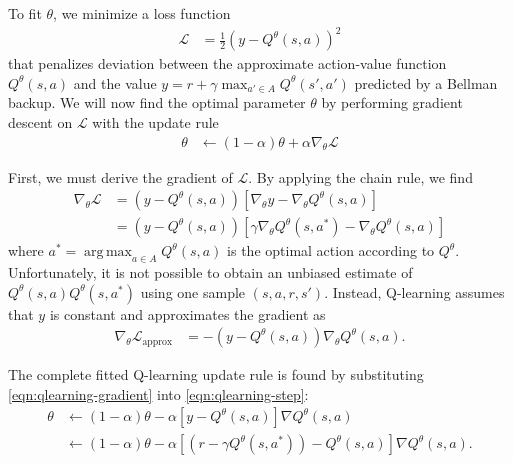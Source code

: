 \documentclass[11pt]{article}
\numberwithin{equation}{section}
\numberwithin{figure}{section}
\DeclareMathOperator*{\argmax}{arg\,max}
\begin{document}
To fit $\theta$, we minimize a loss function
\begin{align*}
    \mathcal{L} &= \frac{1}{2} \left( y - Q^\theta(s, a) \right)^2
\end{align*}
that penalizes deviation between the approximate action-value function
$Q^\theta(s, a)$ and the value $y = r + \gamma \max_{a' \in A} Q^\theta(s',
a')$ predicted by a Bellman backup. We will now find the optimal parameter
$\theta$ by performing gradient descent on $\mathcal{L}$ with the update rule
\begin{align}
    \theta &\gets (1 - \alpha) \theta + \alpha \nabla_\theta \mathcal{L}
    \label{eqn:qlearning-step}
\end{align}

First, we must derive the gradient of $\mathcal{L}$. By applying the chain
rule, we find
\begin{align*}
    \nabla_\theta \mathcal{L} &= \left(y - Q^\theta(s, a)\right) \left[
                                      \nabla_\theta y
                                    - \nabla_\theta Q^\theta(s, a) \right] \\
                              &= \left(y - Q^\theta(s, a)\right) \left[
                                      \gamma \nabla_\theta Q^\theta(s, a^*)
                                    - \nabla_\theta Q^\theta(s, a) \right]
\end{align*}
where $a^* = \argmax_{a \in A} Q^\theta(s, a)$ is the optimal action according
to $Q^\theta$. Unfortunately, it is not possible to obtain an unbiased estimate
of $Q^\theta(s, a) Q^\theta(s, a^*)$ using one sample $(s, a, r, s')$. Instead,
Q-learning assumes that $y$ is constant and approximates the gradient as
\begin{align}
    \nabla_\theta \mathcal{L}_\text{approx} &= -\left(y - Q^\theta(s, a)\right)
                                       \nabla_\theta Q^\theta(s, a).
    \label{eqn:qlearning-gradient}
\end{align}

The complete fitted Q-learning update rule is found by substituting
\cref{eqn:qlearning-gradient} into \cref{eqn:qlearning-step}:
\begin{align*}
    \theta &\gets (1 - \alpha) \theta - \alpha \left[
                y - Q^\theta(s, a)\right] \nabla Q^\theta (s, a) \\
           &\gets (1 - \alpha) \theta - \alpha \left[
                \left( r - \gamma Q^\theta(s, a^*) \right)
                - Q^\theta(s, a)\right] \nabla Q^\theta (s, a).
\end{align*}
\end{document}
